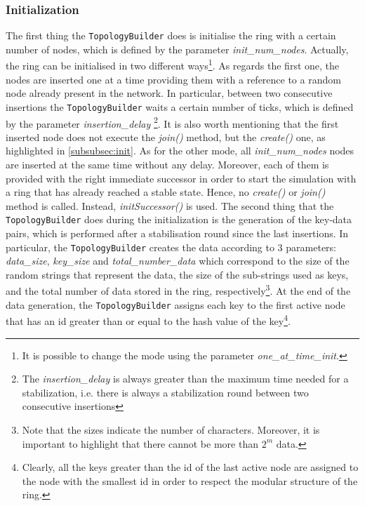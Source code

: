 \documentclass[11pt,twocolumn,letterpaper]{article}
\begin{document}
	\subsubsection{Initialization}
	\label{subsubsec:top-init}
	The first thing the \texttt{TopologyBuilder} does is initialise the ring with a certain number of nodes, which is defined by the parameter \textit{init\_num\_nodes}. Actually, the ring can be initialised in two different ways\footnote{It is possible to change the mode using the parameter \textit{one\_at\_time\_init}.}. As regards the first one, the nodes are inserted one at a time providing them with a reference to a random node already present in the network. In particular, between two consecutive insertions the \texttt{TopologyBuilder} waits a certain number of ticks, which is defined by the parameter \textit{insertion\_delay} \footnote{The \textit{insertion\_delay} is always greater than the maximum time needed for a stabilization, i.e. there is always a stabilization round between two consecutive insertions}. It is also worth mentioning that the first inserted node does not execute the \textit{join()} method, but the \textit{create()} one, as highlighted in \cref{subsubsec:init}. As for the other mode, all \textit{init\_num\_nodes} nodes are inserted at the same time without any delay. Moreover, each of them is provided with the right immediate successor in order to start the simulation with a ring that has already reached a stable state. Hence, no \textit{create()} or \textit{join()} method is called. Instead, \textit{initSuccessor()} is used. \newline
	The second thing that the \texttt{TopologyBuilder} does during the initialization is the generation of the key-data pairs, which is performed after a stabilisation round since the last insertions. In particular, the \texttt{TopologyBuilder} creates the data according to 3 parameters: \textit{data\_size}, \textit{key\_size} and \textit{total\_number\_data} which correspond to the size of the random strings that represent the data, the size of the sub-strings used as keys, and the total number of data stored in the ring, respectively\footnote{Note that the sizes indicate the number of characters. Moreover, it is important to highlight that there cannot be more than $2^m$ data.}. At the end of the data generation, the \texttt{TopologyBuilder} assigns each key to the first active node that has an id greater than or equal to the hash value of the key\footnote{Clearly, all the keys greater than the id of the last active node are assigned to the node with the smallest id in order to respect the modular structure of the ring.}.
	
\end{document}
